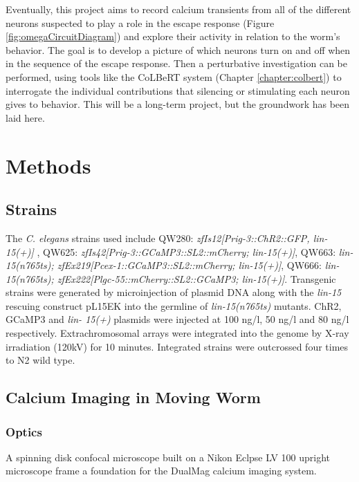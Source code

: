 Eventually, this project aims to record calcium transients from all of the different neurons suspected to play a role in the escape response (Figure \ref{fig:omegaCircuitDiagram}) and explore their activity in relation to the worm's behavior.  The goal is to develop a picture of which neurons turn on and off when in the sequence of the escape response. Then a perturbative investigation can be performed, using tools like the CoLBeRT system (Chapter \ref{chapter:colbert}) to interrogate the individual contributions that silencing or stimulating each neuron gives to behavior. This will be a long-term project, but the groundwork has been laid here. 

\section{Methods}

\subsection{Strains}
The \textit{C. elegans} strains used include QW280: \textit{zfIs12[Prig-3::ChR2::GFP, lin-15(+)]}
, QW625: \textit{zfIs42[Prig-3::GCaMP3::SL2::mCherry; lin-15(+)]}, QW663: \textit{lin-15(n765ts); zfEx219[Pcex-1::GCaMP3::SL2::mCherry; lin-15(+)]}, QW666: \textit{lin-15(n765ts);
zfEx222[Plgc-55::mCherry::SL2::GCaMP3; lin-15(+)]}. Transgenic strains were
generated by microinjection of plasmid DNA along with the \textit{lin-15} rescuing construct
pL15EK into the germline of \textit{lin-15(n765ts)} mutants. ChR2, GCaMP3 and \textit{lin-
15(+)} plasmids were injected at 100 ng/\textmu l, 50 ng/\textmu l and 80 ng/\textmu l respectively.
Extrachromosomal arrays were integrated into the genome by X-ray irradiation (120kV)
for 10 minutes. Integrated strains were outcrossed four times to N2 wild type.

\subsection{Calcium Imaging in Moving Worm}
\subsubsection{Optics}\label{sec:omegaOptics}
A spinning disk confocal microscope built on a Nikon Eclpse LV 100 upright microscope frame  a foundation for the DualMag calcium imaging system. 

